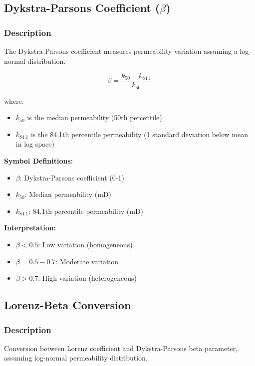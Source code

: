 \documentclass[11pt,a4paper]{article}
\newcommand{\symitem}[2]{\item \textbf{#1}: #2}
\begin{document}
\subsection{Dykstra-Parsons Coefficient ($\beta$)}

\subsubsection{Description}
The Dykstra-Parsons coefficient measures permeability variation assuming a log-normal distribution.

\begin{tcolorbox}[colback=formulabox,colframe=black!75]
\begin{equation}
\beta = \frac{k_{50} - k_{84.1}}{k_{50}}
\end{equation}

where:
\begin{itemize}
\item $k_{50}$ is the median permeability (50th percentile)
\item $k_{84.1}$ is the 84.1th percentile permeability (1 standard deviation below mean in log space)
\end{itemize}
\end{tcolorbox}

\textbf{Symbol Definitions:}
\begin{itemize}[leftmargin=2cm]
\symitem{$\beta$}{Dykstra-Parsons coefficient (0-1)}
\symitem{$k_{50}$}{Median permeability (mD)}
\symitem{$k_{84.1}$}{84.1th percentile permeability (mD)}
\end{itemize}

\textbf{Interpretation:}
\begin{itemize}
\item $\beta < 0.5$: Low variation (homogeneous)
\item $\beta = 0.5 - 0.7$: Moderate variation
\item $\beta > 0.7$: High variation (heterogeneous)
\end{itemize}

\subsection{Lorenz-Beta Conversion}

\subsubsection{Description}
Conversion between Lorenz coefficient and Dykstra-Parsons beta parameter, assuming log-normal permeability distribution.
\end{document}
